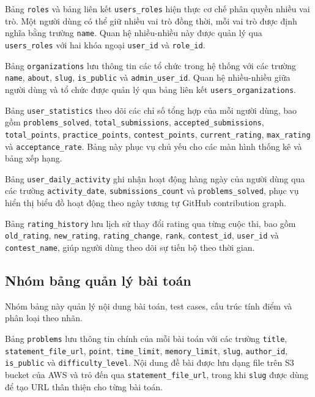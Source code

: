 \documentclass[12pt, a4paper]{report}
\begin{document}
Bảng \texttt{roles} và bảng liên kết \texttt{users\_roles} hiện thực cơ chế phân quyền nhiều vai trò. Một người dùng có thể giữ nhiều vai trò đồng thời, mỗi vai trò được định nghĩa bằng trường \texttt{name}. Quan hệ nhiều-nhiều này được quản lý qua \texttt{users\_roles} với hai khóa ngoại \texttt{user\_id} và \texttt{role\_id}.

Bảng \texttt{organizations} lưu thông tin các tổ chức trong hệ thống với các trường \texttt{name}, \texttt{about}, \texttt{slug}, \texttt{is\_public} và \texttt{admin\_user\_id}. Quan hệ nhiều-nhiều giữa người dùng và tổ chức được quản lý qua bảng liên kết \texttt{users\_organizations}.

Bảng \texttt{user\_statistics} theo dõi các chỉ số tổng hợp của mỗi người dùng, bao gồm \texttt{problems\_solved}, \texttt{total\_submissions}, \texttt{accepted\_submissions}, \texttt{total\_points}, \texttt{practice\_points}, \texttt{contest\_points}, \texttt{current\_rating}, \texttt{max\_rating} và \texttt{acceptance\_rate}. Bảng này phục vụ chủ yếu cho các màn hình thống kê và bảng xếp hạng.

Bảng \texttt{user\_daily\_activity} ghi nhận hoạt động hàng ngày của người dùng qua các trường \texttt{activity\_date}, \texttt{submissions\_count} và \texttt{problems\_solved}, phục vụ hiển thị biểu đồ hoạt động theo ngày tương tự GitHub contribution graph.

Bảng \texttt{rating\_history} lưu lịch sử thay đổi rating qua từng cuộc thi, bao gồm \texttt{old\_rating}, \texttt{new\_rating}, \texttt{rating\_change}, \texttt{rank}, \texttt{contest\_id}, \texttt{user\_id} và \texttt{contest\_name}, giúp người dùng theo dõi sự tiến bộ theo thời gian.

\subsection{Nhóm bảng quản lý bài toán}

Nhóm bảng này quản lý nội dung bài toán, test cases, cấu trúc tính điểm và phân loại theo nhãn.

Bảng \texttt{problems} lưu thông tin chính của mỗi bài toán với các trường \texttt{title}, \texttt{statement\_file\_url}, \texttt{point}, \texttt{time\_limit}, \texttt{memory\_limit}, \texttt{slug}, \texttt{author\_id}, \texttt{is\_public} và \texttt{difficulty\_level}. Nội dung đề bài được lưu dạng file trên S3 bucket của AWS và trỏ đến qua \texttt{statement\_file\_url}, trong khi \texttt{slug} được dùng để tạo URL thân thiện cho từng bài toán.
\end{document}
